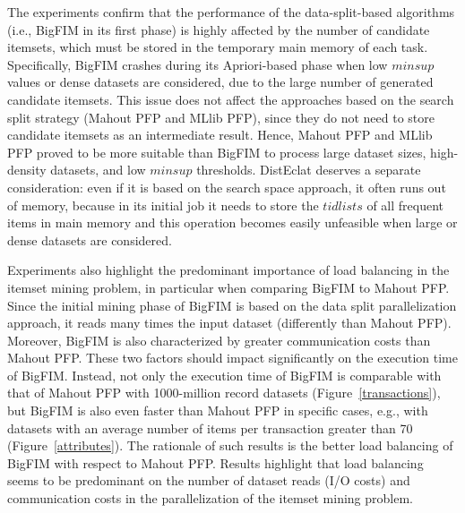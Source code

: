 The experiments confirm that the performance of the data-split-based algorithms
(i.e., BigFIM in its first phase) is highly affected by the number of candidate itemsets, 
which must be stored in the temporary main memory of each task. 
Specifically, BigFIM crashes during its Apriori-based phase when low $minsup$ values or dense datasets are considered,
due to the large number of generated candidate itemsets. 
This issue does not affect the approaches based on the search split strategy (Mahout PFP and MLlib PFP), 
since they do not need to store candidate itemsets as an intermediate result.
Hence, Mahout PFP and MLlib PFP proved to be more suitable than BigFIM to process large dataset sizes, high-density datasets, and low $minsup$ thresholds. 
DistEclat deserves a separate consideration: even if it is based on the search space approach, 
it often runs out of memory,
because in its initial job it needs to store the $tidlists$ of all frequent items in main memory 
and this operation becomes easily unfeasible when large or dense datasets are considered. 

Experiments also highlight the predominant importance of load balancing in the itemset mining problem, 
in particular when comparing BigFIM to Mahout PFP. 
Since the initial mining phase of BigFIM is based on the data split parallelization approach,
it reads many times the input dataset (differently than Mahout PFP).
Moreover, BigFIM is also characterized by greater communication costs than Mahout PFP. 
These two factors should impact significantly on the execution time of BigFIM. 
Instead, 
not only the execution time of BigFIM is comparable with that of Mahout PFP 
with 1000-million record datasets (Figure~\ref{transactions}),
but BigFIM is also even faster than Mahout PFP in specific cases, e.g., 
with datasets with an average number of items per transaction greater than 70 (Figure~\ref{attributes}).
The rationale of 	such results is the better load balancing of BigFIM with respect to Mahout PFP. 
Results highlight that load balancing seems to be predominant on the number of dataset reads (I/O costs) and communication costs in the parallelization of the itemset mining problem.





